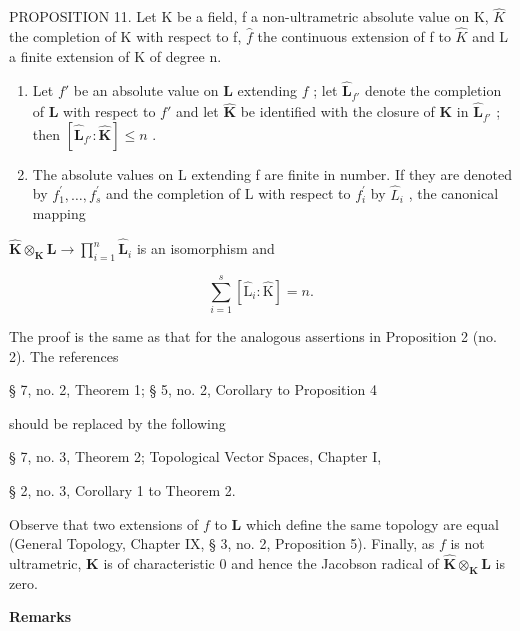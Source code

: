 PROPOSITION 11. Let K be a field, f a non-ultrametric absolute value on K, \(\hat{K}\) the completion of K with respect to f, \(\hat{f}\) the continuous extension of f to \(\hat{K}\) and L a finite extension of K of degree n.

\begin{enumerate}
\def\labelenumi{(\alph{enumi})}
\item
  Let \(f'\) be an absolute value on \(\mathbf{L}\) extending \(f\) ; let \(\hat{\mathbf{L}}_{f'}\) denote the completion of \(\mathbf{L}\) with respect to \(f'\) and let \(\hat{\mathbf{K}}\) be identified with the closure of \(\mathbf{K}\) in \(\hat{\mathbf{L}}_{f'}\) ; then \([\hat{\mathbf{L}}_{f'}: \hat{\mathbf{K}}] \leqslant n\) .
\item
  The absolute values on L extending f are finite in number. If they are denoted by \(f_{1}^{\prime}, \ldots, f_{s}^{\prime}\) and the completion of L with respect to \(f_{i}^{\prime}\) by \(\hat{L}_{i}\) , the canonical mapping
\end{enumerate}

\(\hat{\mathbf{K}}\otimes_{\mathbf{K}}\mathbf{L}\rightarrow \prod_{i = 1}^{n}\hat{\mathbf{L}}_i\) is an isomorphism and

\[
\sum_ {i = 1} ^ {s} \left[ \hat {\mathrm{L}} _ {i}: \hat {\mathrm{K}} \right] = n.\tag{10}
\]

The proof is the same as that for the analogous assertions in Proposition 2 (no. 2). The references

§ 7, no. 2, Theorem 1; § 5, no. 2, Corollary to Proposition 4

should be replaced by the following

§ 7, no. 3, Theorem 2; Topological Vector Spaces, Chapter I,

§ 2, no. 3, Corollary 1 to Theorem 2.

Observe that two extensions of \(f\) to \(\mathbf{L}\) which define the same topology are equal (General Topology, Chapter IX, § 3, no. 2, Proposition 5). Finally, as \(f\) is not ultrametric, \(\mathbf{K}\) is of characteristic 0 and hence the Jacobson radical of \(\hat{\mathbf{K}} \otimes_{\mathbf{K}} \mathbf{L}\) is zero.

\textbf{Remarks}\par

